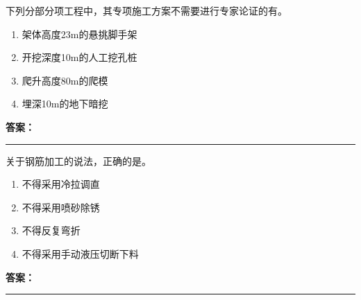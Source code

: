 \documentclass[UTF8,fontset=fandol,11pt]{ctexart}
\newcommand{\answerline}{\textcolor{answerred}{\rule{2.4cm}{0.7pt}}}
\begin{document}
\begin{quizbox}[title={乱序第 33 题｜第七章脚手架工程}]

下列分部分项工程中，其专项施工方案不需要进行专家论证的有。\\

\begin{enumerate}[label=\Alph*.]

\item 架体高度23m的悬挑脚手架

\item 开挖深度10m的人工挖孔桩

\item 爬升高度80m的爬模

\item 埋深10m的地下暗挖

\end{enumerate}

\textbf{\textcolor{answerred}{答案：}} \answerline

\end{quizbox}

\vspace{0.2em}

\begin{quizbox}[title={乱序第 34 题｜第四章混凝土结构工程}]

关于钢筋加工的说法，正确的是。\\

\begin{enumerate}[label=\Alph*.]

\item 不得采用冷拉调直

\item 不得采用喷砂除锈

\item 不得反复弯折

\item 不得采用手动液压切断下料

\end{enumerate}

\textbf{\textcolor{answerred}{答案：}} \answerline

\end{quizbox}

\vspace{0.2em}
\end{document}
